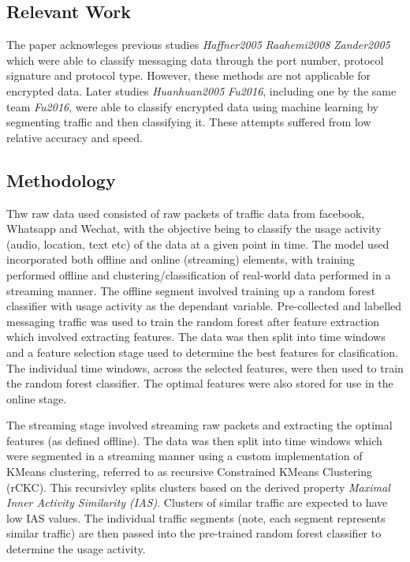 \documentclass[10pt]{article}
\begin{document}
\subsection{Relevant Work}
The paper acknowleges previous studies \emph{Haffner2005} \emph{Raahemi2008}  \emph{Zander2005} which were able to classify messaging data through the port number, protocol signature and protocol type. However, these methods are not applicable for encrypted data. Later studies \emph{Huanhuan2005} \emph{Fu2016}, including one by the same team \emph{Fu2016}, were able to classify encrypted data using machine learning by segmenting traffic and then classifying it. These attempts suffered from low relative accuracy and speed. 



\subsection{Methodology}
Thw raw data used consisted of raw packets of traffic data from facebook, Whatsapp and Wechat, with the objective being to classify the usage activity (audio, location, text etc) of the data at a given point in time. The model used incorporated both offline and online (streaming) elements, with training performed offline and clustering/classification of real-world data performed in a streaming manner. The offline segment involved training up a random forest classifier with usage activity as the dependant variable. Pre-collected and labelled messaging traffic was used to train the random forest after feature extraction which involved extracting features. The data was then split into time windows and a feature selection stage used to determine the best features for clasification. The individual time windows, across the selected features, were then used to train the random forest classifier. The optimal features were also stored for use in the online stage.

The streaming stage involved streaming raw packets and extracting the optimal features (as defined offline). The data was then split into time windows which were segmented in a streaming manner using a custom implementation of KMeans clustering, referred to as recursive Constrained KMeans Clustering (rCKC). This recursivley splits clusters based on the derived property \textit{Maximal Inner Activity Similarity (IAS)}. Clusters of similar traffic are expected to have low IAS values. The individual traffic segments (note, each segment represents similar traffic) are then passed into the pre-trained random forest classifier to determine the usage activity.
\end{document}
